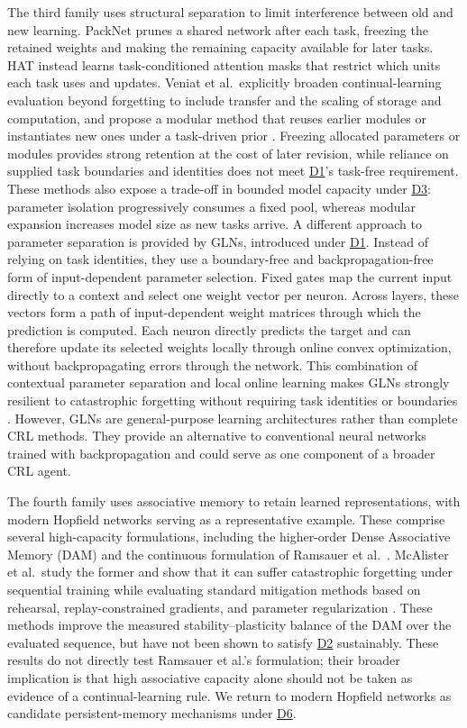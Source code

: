 \documentclass[10pt,journal,compsoc]{IEEEtran}
\DeclareRobustCommand{\Dref}[1]{\hyperref[sec:d#1]{D#1}}
\begin{document}
The third family uses structural separation to limit interference between old and new learning.
PackNet \cite{mallya2018} prunes a shared network after each task, freezing the retained weights and making the remaining capacity available for later tasks.
HAT \cite{serra2018} instead learns task-conditioned attention masks that restrict which units each task uses and updates.
Veniat et al.\ explicitly broaden continual-learning evaluation beyond forgetting to include transfer and the scaling of storage and computation, and propose a modular method that reuses earlier modules or instantiates new ones under a task-driven prior \cite{veniat2021}.
Freezing allocated parameters or modules provides strong retention at the cost of later revision, while reliance on supplied task boundaries and identities does not meet \Dref{1}'s task-free requirement.
These methods also expose a trade-off in bounded model capacity under \Dref{3}: parameter isolation progressively consumes a fixed pool, whereas modular expansion increases model size as new tasks arrive.
A different approach to parameter separation is provided by GLNs, introduced under \Dref{1}.
Instead of relying on task identities, they use a boundary-free and backpropagation-free form of input-dependent parameter selection.
Fixed gates map the current input directly to a context and select one weight vector per neuron.
Across layers, these vectors form a path of input-dependent weight matrices through which the prediction is computed.
Each neuron directly predicts the target and can therefore update its selected weights locally through online convex optimization, without backpropagating errors through the network.
This combination of contextual parameter separation and local online learning makes GLNs strongly resilient to catastrophic forgetting without requiring task identities or boundaries \cite{veness2021}.
However, GLNs are general-purpose learning architectures rather than complete CRL methods.
They provide an alternative to conventional neural networks trained with backpropagation and could serve as one component of a broader CRL agent.

The fourth family uses associative memory to retain learned representations, with modern Hopfield networks serving as a representative example.
These comprise several high-capacity formulations, including the higher-order Dense Associative Memory (DAM) \cite{krotov2016} and the continuous formulation of Ramsauer et al.\ \cite{ramsauer2021}.
McAlister et al.\ study the former and show that it can suffer catastrophic forgetting under sequential training while evaluating standard mitigation methods based on rehearsal, replay-constrained gradients, and parameter regularization \cite{mcalister2025}.
These methods improve the measured stability--plasticity balance of the DAM over the evaluated sequence, but have not been shown to satisfy \Dref{2} sustainably.
These results do not directly test Ramsauer et al.'s formulation; their broader implication is that high associative capacity alone should not be taken as evidence of a continual-learning rule.
We return to modern Hopfield networks as candidate persistent-memory mechanisms under \Dref{6}.
\end{document}
